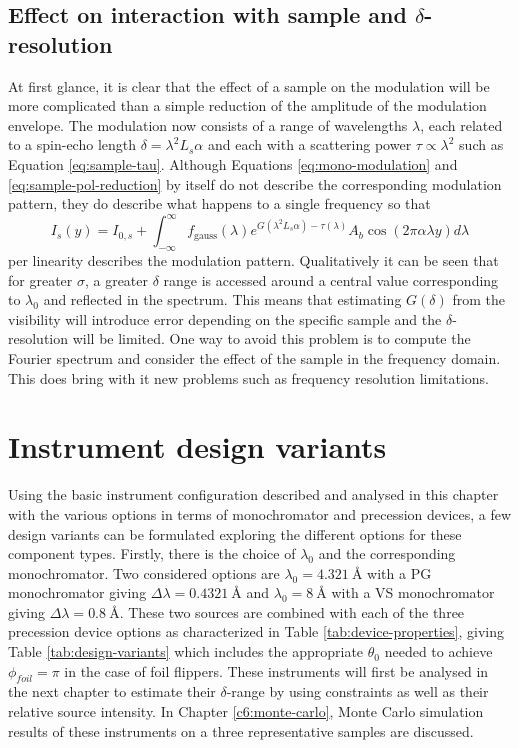 \subsection{Effect on interaction with sample and $\delta$-resolution}
At first glance, it is clear that the effect of a sample on the modulation will be more complicated than a simple reduction of the amplitude of the modulation envelope. The modulation now consists of a range of wavelengths $\lambda$, each related to a spin-echo length $\delta = \lambda^2 L_s\alpha$ and each with a scattering power $\tau \propto\lambda^2$ such as Equation \eqref{eq:sample-tau}. Although Equations \eqref{eq:mono-modulation} and \eqref{eq:sample-pol-reduction} by itself do not describe the corresponding modulation pattern, they do describe what happens to a single frequency so that
\begin{equation}
	I_s(y) = I_{0,s} + \int_{-\infty}^\infty f_{\text{gauss}}(\lambda)e^{G(\lambda^2 L_s\alpha) - \tau(\lambda)}A_b\cos(2\pi\alpha\lambda y)d\lambda \label{eq:poly-sample-modulation}
\end{equation}
per linearity describes the modulation pattern. Qualitatively it can be seen that for greater $\sigma$, a greater $\delta$ range is accessed around a central value corresponding to $\lambda_0$ and reflected in the spectrum. This means that estimating $G(\delta)$ from the visibility will introduce error depending on the specific sample and the $\delta$-resolution will be limited. One way to avoid this problem is to compute the Fourier spectrum and consider the effect of the sample in the frequency domain. This does bring with it new problems such as frequency resolution limitations. 


\section{Instrument design variants}
\label{c3.7}
Using the basic instrument configuration described and analysed in this chapter with the various options in terms of monochromator and precession devices, a few design variants can be formulated exploring the different options for these component types. Firstly, there is the choice of $\lambda_0$ and the corresponding monochromator. Two considered options are $\lambda_0 = \SI{4.321}{\angstrom}$ with a PG monochromator giving $\Delta\lambda = \SI{0.4321}{\angstrom}$ and $\lambda_0 = \SI{8}{\angstrom}$ with a VS monochromator giving $\Delta\lambda = \SI{0.8}{\angstrom}$. These two sources are combined with each of the three precession device options as characterized in Table \ref{tab:device-properties}, giving Table \ref{tab:design-variants} which includes the appropriate $\theta_0$ needed to achieve $\phi_{foil} = \pi$ in the case of foil flippers. These instruments will first be analysed in the next chapter to estimate their $\delta$-range by using constraints as well as their relative source intensity. In Chapter \ref{c6:monte-carlo}, Monte Carlo simulation results of these instruments on a three representative samples are discussed. 


